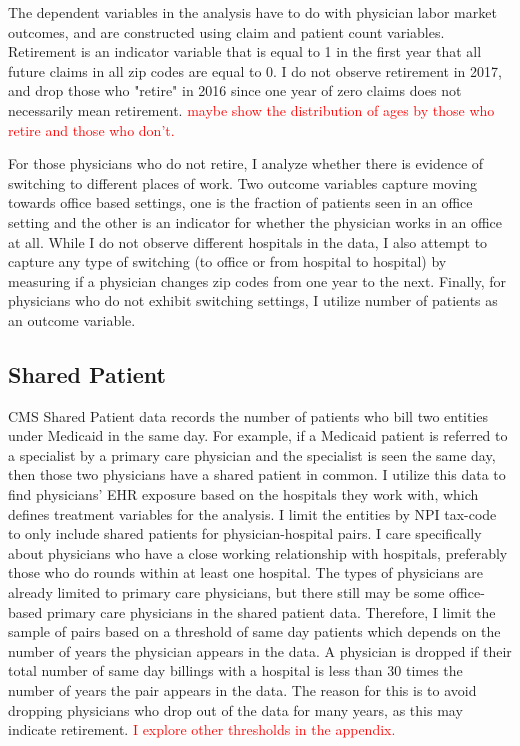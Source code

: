 \documentclass[11pt]{article}
\begin{document}
The dependent variables in the analysis have to do with physician labor market outcomes, and are constructed using claim and patient count variables. Retirement is an indicator variable that is equal to 1 in the first year that all future claims in all zip codes are equal to 0. I do not observe retirement in 2017, and drop those who "retire" in 2016 since one year of zero claims does not necessarily mean retirement. \textcolor{red}{maybe show the distribution of ages by those who retire and those who don't.} 

For those physicians who do not retire, I analyze whether there is evidence of switching to different places of work. Two outcome variables capture moving towards office based settings, one is the fraction of patients seen in an office setting and the other is an indicator for whether the physician works in an office at all. While I do not observe different hospitals in the data, I also attempt to capture any type of switching (to office or from hospital to hospital) by measuring if a physician changes zip codes from one year to the next. Finally, for physicians who do not exhibit switching settings, I utilize number of patients as an outcome variable. 


\subsection{Shared Patient}

CMS Shared Patient data records the number of patients who bill two entities under Medicaid in the same day. For example, if a Medicaid patient is referred to a specialist by a primary care physician and the specialist is seen the same day, then those two physicians have a shared patient in common. I utilize this data to find physicians' EHR exposure based on the hospitals they work with, which defines treatment variables for the analysis. I limit the entities by NPI tax-code to only include shared patients for physician-hospital pairs. I care specifically about physicians who have a close working relationship with hospitals, preferably those who do rounds within at least one hospital. The types of physicians are already limited to primary care physicians, but there still may be some office-based primary care physicians in the shared patient data. Therefore, I limit the sample of pairs based on a threshold of same day patients which depends on the number of years the physician appears in the data. A physician is dropped if their total number of same day billings with a hospital is less than 30 times the number of years the pair appears in the data. The reason for this is to avoid dropping physicians who drop out of the data for many years, as this may indicate retirement. \textcolor{red}{I explore other thresholds in the appendix.} 
\end{document}
